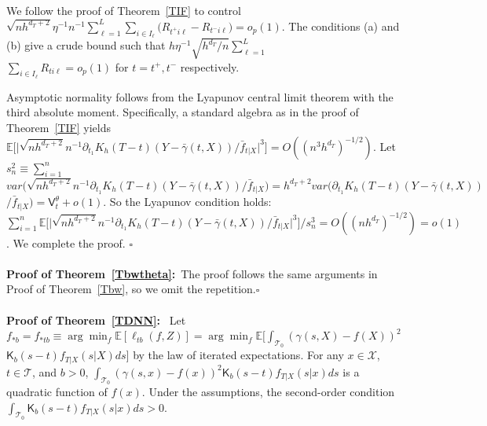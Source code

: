 \documentclass[lettersize, 12pt]{article}
\begin{document}

We follow the proof of Theorem~\ref{TIF} to control $\sqrt{nh^{d_T+2}} \eta^{-1} n^{-1} \sum_{\ell=1}^L\sum_{i\in I_\ell} \big(R_{t^+i\ell} - R_{t^-i\ell}\big) = o_p(1)$.
The conditions (a) and (b) give a crude bound such that $h\eta^{-1} \sqrt{h^{d_T}/n} \sum_{\ell=1}^L$\\
$ \sum_{i \in I_\ell} R_{ti\ell} = o_p(1)$ for $t = t^+, t^-$ respectively.





Asymptotic normality follows from the Lyapunov central limit theorem with the third absolute moment.
Specifically, a standard algebra as in the proof of Theorem~\ref{TIF} yields 
$\mathbb{E}\Big[\big|\sqrt{nh^{d_T+2}}n^{-1}
\partial_{t_1} K_h(T-t) (Y-\bar \gamma(t,X))/\bar f_{t|X}
\big|^3\Big]
= O((n^3h^{d_T})^{-1/2})$.
Let $s_n^2 \equiv \sum_{i=1}^n $\\$var\big( \sqrt{nh^{d_T+2}}n^{-1}
\partial_{t_1} K_h(T-t) (Y-\bar \gamma(t,X))/\bar f_{t|X}
\big)
 = h^{d_T+2} var(\partial_{t_1} K_h(T-t) (Y-\bar \gamma(t,X))$\\$/\bar f_{t|X}) = \mathsf{V}_t^\theta + o(1)$.
So the Lyapunov condition holds: $\sum_{i=1}^n
\mathbb{E}\big[\big|\sqrt{nh^{d_T+2}}n^{-1}
\partial_{t_1} K_h(T-t) (Y-\bar \gamma(t,X))/\bar f_{t|X}
\big|^3\big]/s_n^3 = O((nh^{d_T})^{-1/2}) = o(1)$.
We complete the proof.
\hfill $\square$
\\ \\
\textbf{Proof of Theorem~\ref{Tbwtheta}:}\
The proof follows the same arguments in Proof of Theorem~\ref{Tbw}, so we omit the repetition.\hfill $\square$
\\ \\
\textbf{Proof of Theorem~\ref{TDNN}:}\
Let $f_{\ast b} = f_{\ast t b} \equiv \arg\min_{f} \mathbb{E}[ \ell_{tb}(f, Z)]
= \arg\min_{f} \mathbb{E}\big[ \int_{\mathcal{T}_0} (\gamma(s,X) - f(X))^2$ $\mathsf{K}_b(s-t) f_{T|X}(s|X)ds\big]$
by the law of iterated expectations.
For any $x\in\mathcal{X}$, $t\in\mathcal{T}$, and $b > 0$, $\int_{\mathcal{T}_0} (\gamma(s,x) - f(x))^2 \mathsf{K}_b(s-t) f_{T|X}(s|x)ds$ is a quadratic function of $f(x)$.
Under the assumptions, the second-order condition $\int_{\mathcal{T}_0} \mathsf{K}_b(s-t) f_{T|X}(s|x) ds > 0$.
\end{document}
